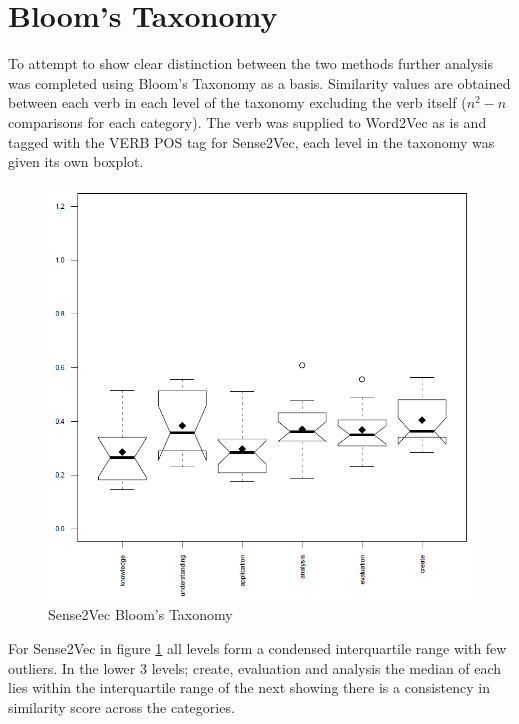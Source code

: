 \section{Bloom's Taxonomy}
To attempt to show clear distinction between the two methods further analysis was completed using Bloom's Taxonomy as a basis. Similarity values are obtained between each verb in each level of the taxonomy excluding the verb itself ($n^2-n$ comparisons for each category). The verb was supplied to Word2Vec as is and tagged with the VERB POS tag for Sense2Vec, each level in the taxonomy was given its own boxplot.

\begin{figure}[H]
\centering
  \includegraphics[width=.9\textwidth]{images/s2v_bloom.PNG}
  \caption{Sense2Vec Bloom's Taxonomy}
  \label{fig:bloom_s2v}
\end{figure}

\noindent
For Sense2Vec in figure \ref{fig:bloom_s2v} all levels form a condensed interquartile range with few outliers. In the lower 3 levels; create, evaluation and analysis the median of each lies within the interquartile range of the next showing there is a consistency in similarity score across the categories.

